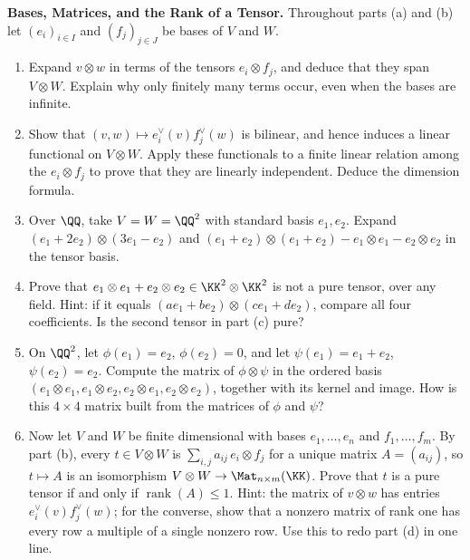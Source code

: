 \documentclass[12pt,reqno]{amsart}
\providecommand{\rank}{\operatorname{rank}}
\begin{document}
\begin{problems}
\item\label{t:basis} \textbf{Bases, Matrices, and the Rank of a Tensor.} Throughout parts (a) and (b) let $(e_i)_{i\in I}$ and $(f_j)_{j\in J}$ be bases of $V$ and $W$.
\begin{enumerate}
\item Expand $v\otimes w$ in terms of the tensors $e_i\otimes f_j$, and deduce that they span $V\otimes W$. Explain why only finitely many terms occur, even when the bases are infinite.
\item Show that $(v,w)\mapsto e_i^{\vee}(v)f_j^{\vee}(w)$ is bilinear, and hence induces a linear functional on $V\otimes W$. Apply these functionals to a finite linear relation among the $e_i\otimes f_j$ to prove that they are linearly independent. Deduce the dimension formula.
\item Over $\QQ$, take $V=W=\QQ^2$ with standard basis $e_1,e_2$. Expand $(e_1+2e_2)\otimes(3e_1-e_2)$ and $(e_1+e_2)\otimes(e_1+e_2)-e_1\otimes e_1-e_2\otimes e_2$ in the tensor basis.
\item Prove that $e_1\otimes e_1+e_2\otimes e_2\in\KK^2\otimes\KK^2$ is not a pure tensor, over any field. Hint: if it equals $(ae_1+be_2)\otimes(ce_1+de_2)$, compare all four coefficients. Is the second tensor in part (c) pure?
\item On $\QQ^2$, let $\phi(e_1)=e_2$, $\phi(e_2)=0$, and let $\psi(e_1)=e_1+e_2$, $\psi(e_2)=e_2$. Compute the matrix of $\phi\otimes\psi$ in the ordered basis $(e_1\otimes e_1,e_1\otimes e_2,e_2\otimes e_1,e_2\otimes e_2)$, together with its kernel and image. How is this $4\times4$ matrix built from the matrices of $\phi$ and $\psi$?
\item Now let $V$ and $W$ be finite dimensional with bases $e_1,\ldots,e_n$ and $f_1,\ldots,f_m$. By part (b), every $t\in V\otimes W$ is $\sum_{i,j}a_{ij}\,e_i\otimes f_j$ for a unique matrix $A=(a_{ij})$, so $t\mapsto A$ is an isomorphism $V\otimes W\to\Mat_{n\times m}(\KK)$. Prove that $t$ is a pure tensor if and only if $\rank(A)\leq1$. Hint: the matrix of $v\otimes w$ has entries $e_i^{\vee}(v)f_j^{\vee}(w)$; for the converse, show that a nonzero matrix of rank one has every row a multiple of a single nonzero row. Use this to redo part (d) in one line.

\end{enumerate}
\end{problems}
\end{document}
